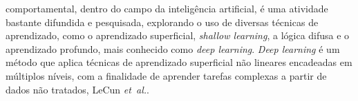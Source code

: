 \documentclass[10pt,journal,compsoc]{IEEEtran}
\begin{document}
\nocite{*}




% 
% 
% 
% 


 comportamental, dentro do campo da inteligência artificial, é uma
atividade bastante difundida e pesquisada, explorando o uso de diversas técnicas de aprendizado,
como o aprendizado superficial, \textit{shallow learning}, a lógica
difusa e o aprendizado profundo, mais conhecido como \textit{deep
  learning}. \textit{Deep learning} é um método que aplica
técnicas de aprendizado superficial não lineares encadeadas em múltiplos níveis, com a finalidade de aprender tarefas complexas a partir de dados não
tratados, LeCun \emph{et~al.}\cite{Lecun2015436}.
\end{document}
